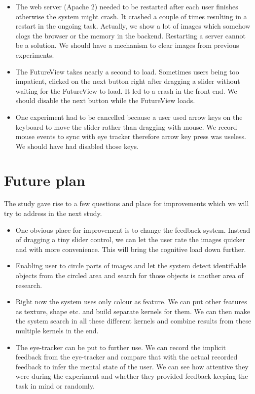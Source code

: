 \documentclass[english]{tktltiki}
\begin{document}
\begin{itemize}
	\item The web server (Apache 2) needed to be restarted after each user finishes otherwise the system might crash. It crashed a couple of times resulting in a restart in the ongoing task. Actually, we show a lot of images which somehow clogs the browser or the memory in the backend. Restarting a server cannot be a solution. We should have a mechanism to clear images from previous experiments.
	\item The FutureView takes nearly a second to load. Sometimes users being too impatient, clicked on the next button right after dragging a slider without waiting for the FutureView to load. It led to a crash in the front end. We should disable the next button while the FutureView loads.
	\item One experiment had to be cancelled because a user used arrow keys on the keyboard to move the slider rather than dragging with mouse. We record mouse events to sync with eye tracker therefore arrow key press was useless. We should have had disabled those keys. 
\end{itemize}

\section{Future plan}

The study gave rise to a few questions and place for improvements which we will try to address in the next study.

\begin{itemize}
	\item One obvious place for improvement is to change the feedback system. Instead of dragging a tiny slider control, we can let the user rate the images quicker and with more convenience. This will bring the cognitive load down further.
	\item Enabling user to circle parts of images and let the system detect identifiable objects from the circled area and search for those objects is another area of research.
	\item Right now the system uses only colour as feature. We can put other features as texture, shape etc. and build separate kernels for them. We can then make the system search in all these different kernels and combine results from these multiple kernels in the end.
	\item The eye-tracker can be put to further use. We can record the implicit feedback from the eye-tracker and compare that with the actual recorded feedback to infer the mental state of the user. We can see how attentive they were during the experiment and whether they provided feedback keeping the task in mind or randomly.
\end{itemize}
\end{document}
